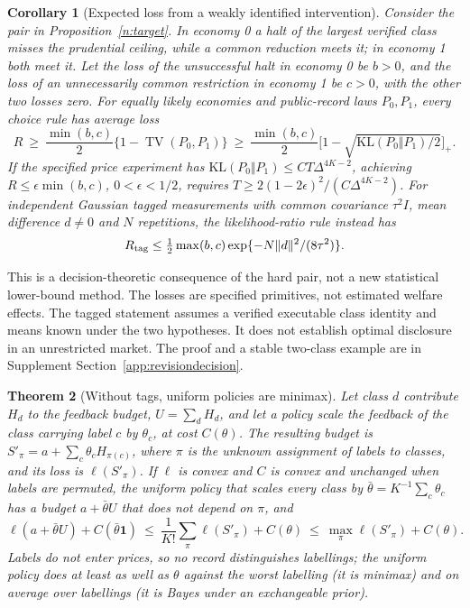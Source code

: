 \documentclass[12pt]{article}
\newtheorem{theorem}{Theorem}[section]
\newtheorem{corollary}[theorem]{Corollary}
\theoremstyle{definition}
\theoremstyle{remark}
\begin{document}
\begin{corollary}[Expected loss from a weakly identified intervention]\label{n:decisionloss}
Consider the pair in Proposition~\ref{n:target}. In economy 0 a halt of the largest verified class misses the prudential ceiling, while a common reduction meets it; in economy 1 both meet it. Let the loss of the unsuccessful halt in economy 0 be $b>0$, and the loss of an unnecessarily common restriction in economy 1 be $c>0$, with the other two losses zero. For equally likely economies and public-record laws $P_0,P_1$, every choice rule has average loss
\[
R\ \ge\ \frac{\min(b,c)}{2}\{1-\operatorname{TV}(P_0,P_1)\}
\ \ge\ \frac{\min(b,c)}{2}\big[1-\sqrt{\mathrm{KL}(P_0\Vert P_1)/2}\big]_+.
\]
If the specified price experiment has $\mathrm{KL}(P_0\Vert P_1)\le C T\Delta^{4K-2}$, achieving $R\le\epsilon\min(b,c)$, $0<\epsilon<1/2$, requires
$T\ge 2(1-2\epsilon)^2/(C\Delta^{4K-2})$.
For independent Gaussian tagged measurements with common covariance $\tau^2I$, mean difference $d\ne0$ and $N$ repetitions, the likelihood-ratio rule instead has
\[
R_{\rm tag}\le \tfrac12\max(b,c)\exp\{-N\|d\|^2/(8\tau^2)\}.
\]
\end{corollary}

This is a decision-theoretic consequence of the hard pair, not a new statistical lower-bound method. The losses are specified primitives, not estimated welfare effects. The tagged statement assumes a verified executable class identity and means known under the two hypotheses. It does not establish optimal disclosure in an unrestricted market. The proof and a stable two-class example are in Supplement Section~\ref{app:revisiondecision}.

\begin{theorem}[Without tags, uniform policies are minimax]\label{n:minimax}
Let class $d$ contribute $H_d$ to the feedback budget, $U=\sum_dH_d$, and let a policy scale the feedback of the class carrying label $c$ by $\theta_c$, at cost $C(\theta)$. The resulting budget is $S'_\pi=a+\sum_c\theta_cH_{\pi(c)}$, where $\pi$ is the unknown assignment of labels to classes, and its loss is $\ell(S'_\pi)$. If $\ell$ is convex and $C$ is convex and unchanged when labels are permuted, the uniform policy that scales every class by $\bar\theta=K^{-1}\sum_c\theta_c$ has a budget $a+\bar\theta U$ that does not depend on $\pi$, and
\[
\ell(a+\bar\theta U)+C(\bar\theta\mathbf 1)\ \le\ \frac1{K!}\sum_\pi\ell(S'_\pi)+C(\theta)\ \le\ \max_\pi\ell(S'_\pi)+C(\theta).
\]
Labels do not enter prices, so no record distinguishes labellings; the uniform policy does at least as well as $\theta$ against the worst labelling (it is minimax) and on average over labellings (it is Bayes under an exchangeable prior).
\end{theorem}
\end{document}
